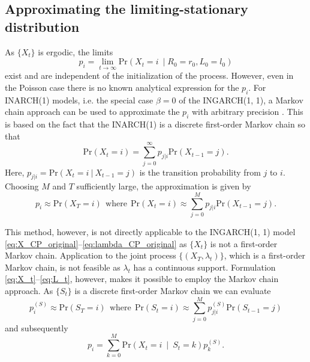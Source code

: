 \documentclass[review]{elsarticle}
\begin{document}
\subsection{Approximating the limiting-stationary distribution}

As $\{X_t\}$ is ergodic, the limits
$$
p_i = \lim_{t \rightarrow \infty} \text{Pr}(X_t = i \ \mid R_0 = r_0, L_0 = l_0)
$$
exist and are independent of the initialization of the process. However, even in the Poisson case there is no known analytical expression for the $p_i$. For INARCH(1) models, i.e. the special case $\beta = 0$ of the INGARCH(1, 1), a Markov chain approach can be used to approximate the $p_i$ with arbitrary precision \cite{Weiss2010}. This is based on the fact that the INARCH(1) is a discrete first-order Markov chain so that
$$
\text{Pr}(X_t = i) = \sum_{j = 0}^\infty p_{j|i} \text{Pr}(X_{t - 1} = j).
$$
Here, $p_{j|i} = \text{Pr}(X_t = i \ | \ X_{t - 1} = j) $ is the transition probability from $j$ to $i$. Choosing $M$ and $T$ sufficiently large, the approximation is given by
$$
p_i \approx \text{Pr}(X_T = i) \ \ \text{where} \ \ \text{Pr}(X_t = i) \approx \sum_{j = 0}^M p_{j|i} \text{Pr}(X_{t - 1} = j).
$$

This method, however, is not directly applicable to the INGARCH(1, 1) model \eqref{eq:X_CP_original}--\eqref{eq:lambda_CP_original} as $\{X_t\}$ is not a first-order Markov chain. Application to the joint process $\{(X_T, \lambda_t)\}$, which is a first-order Markov chain, is not feasible as $\lambda_t$ has a continuous support. Formulation \eqref{eq:X_t}--\eqref{eq:L_t}, however, makes it possible to employ the Markov chain approach. As $\{S_t\}$ is a discrete first-order Markov chain we can evaluate
$$
p^{(S)}_i \approx \text{Pr}(S_T = i) \ \ \text{where} \ \ \text{Pr}(S_t = i) \approx \sum_{j = 0}^M p^{(S)}_{j|i} \text{Pr}(S_{t - 1} = j)
$$
and subsequently
$$
p_i = \sum_{k = 0}^M \text{Pr}(X_t = i \ \mid \ S_t = k) p_k^{(S)}.
$$
\end{document}
